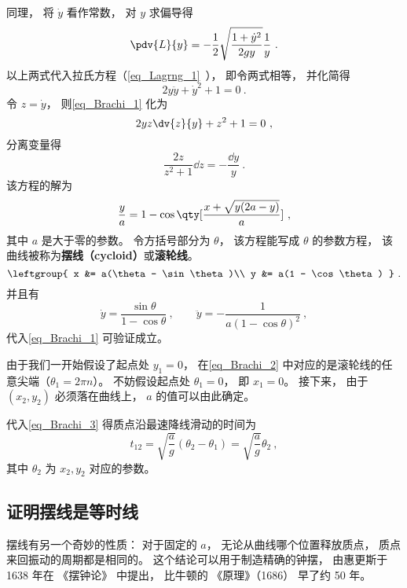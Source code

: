 同理， 将 $\dot y$ 看作常数， 对 $y$ 求偏导得
\begin{equation}
\pdv{L}{y} = -\frac{1}{2} \sqrt{\frac{1 + \dot{y}^2}{2gy}} \frac{1}{y}~.
\end{equation}
以上两式代入拉氏方程（\autoref{eq_Lagrng_1}~）， 即令两式相等， 并化简得
\begin{equation}\label{eq_Brachi_1}
2y\ddot y + \dot y^2 + 1 = 0~.
\end{equation}
令 $z=\dot{y}$， 则\autoref{eq_Brachi_1} 化为
\begin{equation}
2yz\dv{z}{y}+z^2+1=0~,
\end{equation}
分离变量得
\begin{equation}
\frac{2z}{z^2+1}\dd z = -\frac{\dd y}{y}~.
\end{equation}
该方程的解为
\begin{equation}
\frac{y}{a} = 1 - \cos\qty[\frac{x + \sqrt{y(2a-y)}}{a}]~,
\end{equation}
其中 $a$ 是大于零的参数。 令方括号部分为 $\theta$， 该方程能写成 $\theta$ 的参数方程， 该曲线被称为\textbf{摆线（cycloid）}或\textbf{滚轮线}。 %
\begin{equation}\label{eq_Brachi_2}
\leftgroup{
x &= a(\theta - \sin\theta)\\
y &= a(1 - \cos\theta)
}~.\end{equation}
并且有
\begin{equation}
\dot y = \frac{\sin\theta}{1 - \cos\theta} ~,\qquad
\ddot y = -\frac{1}{a(1-\cos\theta)^2}~,
\end{equation}
代入\autoref{eq_Brachi_1} 可验证成立。

由于我们一开始假设了起点处 $y_1 = 0$， 在\autoref{eq_Brachi_2} 中对应的是滚轮线的任意尖端（$\theta_1 = 2\pi n$）。 不妨假设起点处 $\theta_1 = 0$， 即 $x_1 = 0$。 接下来， 由于 $(x_2, y_2)$ 必须落在曲线上，  $a$ 的值可以由此确定。

代入\autoref{eq_Brachi_3} 得质点沿最速降线滑动的时间为
\begin{equation}\label{eq_Brachi_4}
t_{12} = \sqrt{\frac{a}{g}}(\theta_2 - \theta_1) = \sqrt{\frac{a}{g}} \theta_2~,
\end{equation}
其中 $\theta_2$ 为 $x_2, y_2$ 对应的参数。


\subsection{证明摆线是等时线}
摆线有另一个奇妙的性质： 对于固定的 $a$， 无论从曲线哪个位置释放质点， 质点来回振动的周期都是相同的。 这个结论可以用于制造精确的钟摆， 由惠更斯于 1638 年在 《摆钟论》 中提出， 比牛顿的 《原理》（1686） 早了约 50 年。

